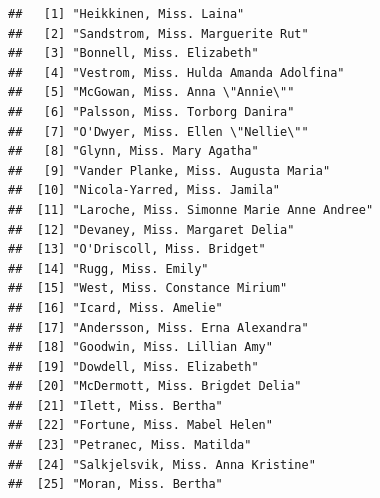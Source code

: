 \documentclass[11pt,]{book}
\newenvironment{Shaded}{\begin{snugshade}}{\end{snugshade}}
\newcommand{\CommentTok}[1]{\textcolor[rgb]{0.37,0.37,0.37}{\textit{#1}}}
\newcommand{\DataTypeTok}[1]{\textcolor[rgb]{0.27,0.27,0.27}{#1}}
\newcommand{\KeywordTok}[1]{\textcolor[rgb]{0.27,0.27,0.27}{\textbf{#1}}}
\newcommand{\NormalTok}[1]{#1}
\newcommand{\OperatorTok}[1]{\textcolor[rgb]{0.43,0.43,0.43}{\textbf{#1}}}
\newcommand{\StringTok}[1]{\textcolor[rgb]{0.5,0.5,0.5}{#1}}
\begin{document}
\begin{Shaded}
\end{Shaded}

\begin{verbatim}
##   [1] "Heikkinen, Miss. Laina"                                               
##   [2] "Sandstrom, Miss. Marguerite Rut"                                      
##   [3] "Bonnell, Miss. Elizabeth"                                             
##   [4] "Vestrom, Miss. Hulda Amanda Adolfina"                                 
##   [5] "McGowan, Miss. Anna \"Annie\""                                        
##   [6] "Palsson, Miss. Torborg Danira"                                        
##   [7] "O'Dwyer, Miss. Ellen \"Nellie\""                                      
##   [8] "Glynn, Miss. Mary Agatha"                                             
##   [9] "Vander Planke, Miss. Augusta Maria"                                   
##  [10] "Nicola-Yarred, Miss. Jamila"                                          
##  [11] "Laroche, Miss. Simonne Marie Anne Andree"                             
##  [12] "Devaney, Miss. Margaret Delia"                                        
##  [13] "O'Driscoll, Miss. Bridget"                                            
##  [14] "Rugg, Miss. Emily"                                                    
##  [15] "West, Miss. Constance Mirium"                                         
##  [16] "Icard, Miss. Amelie"                                                  
##  [17] "Andersson, Miss. Erna Alexandra"                                      
##  [18] "Goodwin, Miss. Lillian Amy"                                           
##  [19] "Dowdell, Miss. Elizabeth"                                             
##  [20] "McDermott, Miss. Brigdet Delia"                                       
##  [21] "Ilett, Miss. Bertha"                                                  
##  [22] "Fortune, Miss. Mabel Helen"                                           
##  [23] "Petranec, Miss. Matilda"                                              
##  [24] "Salkjelsvik, Miss. Anna Kristine"                                     
##  [25] "Moran, Miss. Bertha"                                                  

\end{verbatim}
\end{document}
